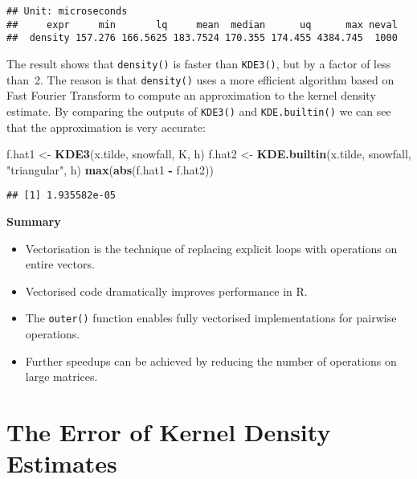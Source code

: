 \documentclass[
  a4paper,
]{article}
\newenvironment{Shaded}{\begin{snugshade}}{\end{snugshade}}
\newcommand{\FunctionTok}[1]{\textcolor[rgb]{0.13,0.29,0.53}{\textbf{#1}}}
\newcommand{\NormalTok}[1]{#1}
\newcommand{\OtherTok}[1]{\textcolor[rgb]{0.56,0.35,0.01}{#1}}
\newcommand{\SpecialCharTok}[1]{\textcolor[rgb]{0.81,0.36,0.00}{\textbf{#1}}}
\newcommand{\StringTok}[1]{\textcolor[rgb]{0.31,0.60,0.02}{#1}}
\providecommand{\tightlist}{%
  \setlength{\itemsep}{0pt}\setlength{\parskip}{0pt}}
\theoremstyle{definition}
\theoremstyle{definition}
\theoremstyle{definition}
\theoremstyle{definition}
\theoremstyle{remark}
\begin{document}
\begin{verbatim}
## Unit: microseconds
##     expr     min       lq     mean  median      uq      max neval
##  density 157.276 166.5625 183.7524 170.355 174.455 4384.745  1000
\end{verbatim}

The result shows that \texttt{density()} is faster than \texttt{KDE3()}, but by a factor
of less than~2. The reason is that \texttt{density()} uses a more efficient
algorithm based on Fast Fourier Transform to compute an approximation to the
kernel density estimate. By comparing the outputs of \texttt{KDE3()} and \texttt{KDE.builtin()}
we can see that the approximation is very accurate:

\begin{Shaded}
\begin{Highlighting}[]
\NormalTok{f.hat1 }\OtherTok{\textless{}{-}} \FunctionTok{KDE3}\NormalTok{(x.tilde, snowfall, K, h)}
\NormalTok{f.hat2 }\OtherTok{\textless{}{-}} \FunctionTok{KDE.builtin}\NormalTok{(x.tilde, snowfall, }\StringTok{"triangular"}\NormalTok{, h)}
\FunctionTok{max}\NormalTok{(}\FunctionTok{abs}\NormalTok{(f.hat1 }\SpecialCharTok{{-}}\NormalTok{ f.hat2))}
\end{Highlighting}
\end{Shaded}

\begin{verbatim}
## [1] 1.935582e-05
\end{verbatim}

\textbf{Summary}

\begin{itemize}
\tightlist
\item
  Vectorisation is the technique of replacing explicit loops with operations on entire vectors.
\item
  Vectorised code dramatically improves performance in R.
\item
  The \texttt{outer()} function enables fully vectorised implementations for pairwise operations.
\item
  Further speedups can be achieved by reducing the number of operations on large matrices.
\end{itemize}

\clearpage

\section{The Error of Kernel Density Estimates}\label{X02-error}
\end{document}
